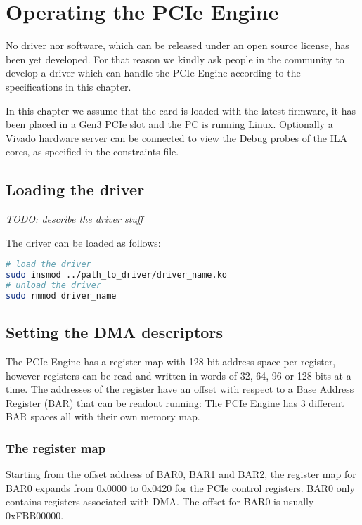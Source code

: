 \section{Operating the PCIe Engine}
No driver nor software, which can be released under an open source license, has been yet developed. For that reason we kindly ask people in the community to develop a driver which can handle the PCIe Engine according to the specifications in this chapter.

In this chapter we assume that the card is loaded with the latest firmware, it has been placed in a Gen3 PCIe slot and the PC is running Linux. Optionally a Vivado hardware server can be connected to view the Debug probes of the ILA cores, as specified in the constraints file. \cite{programming}\

\subsection{Loading the driver}

\emph{TODO: describe the driver stuff}

The driver can be loaded as follows:
\begin{lstlisting}[language=BASH, frame=single, caption=Loading the driver]
# load the driver
sudo insmod ../path_to_driver/driver_name.ko
# unload the driver
sudo rmmod driver_name
\end{lstlisting}


\subsection{Setting the DMA descriptors}

The PCIe Engine has a register map with 128 bit address space per register, however registers can be read and written in words of 32, 64, 96 or 128 bits at a time. The addresses of the register have an offset with respect to a Base Address Register (BAR) that can be readout running: The PCIe Engine has 3 different BAR spaces all with their own memory map. 
\newpage

\subsubsection{The register map}

Starting from the offset address of BAR0, BAR1 and BAR2, the register map for BAR0 expands from 0x0000 to 0x0420 for the PCIe control registers. BAR0 only contains registers associated with DMA. The offset for BAR0 is usually 0xFBB00000.

